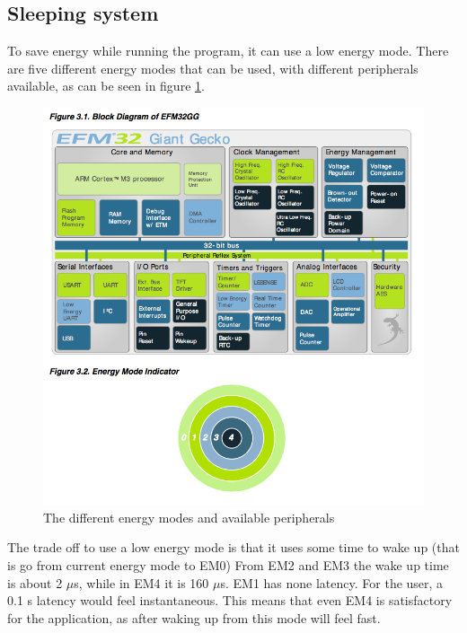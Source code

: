 

\subsection{Sleeping system}
To save energy while running the program, it can use a low energy mode.
There are five different energy modes that can be used, with different peripherals available, as can be seen in figure \ref{fig:energy_modes}.\cite{referencemanual}

\begin{figure}[H]
\centering
\includegraphics[scale=0.5]{figures/energymodes.png}
\caption{The different energy modes and available peripherals}
\label{fig:energy_modes}
\end{figure}

The trade off to use a low energy mode is that it uses some time to wake up (that is go from current energy mode to EM0)
From EM2 and EM3  the wake up time is about 2 $\mu$s, while in EM4 it is 160 $\mu$s.
EM1 has none latency.
For the user, a 0.1 s latency would feel instantaneous.\cite{response}
This means that even EM4 is satisfactory for the application, as after waking up from this mode will feel fast.

